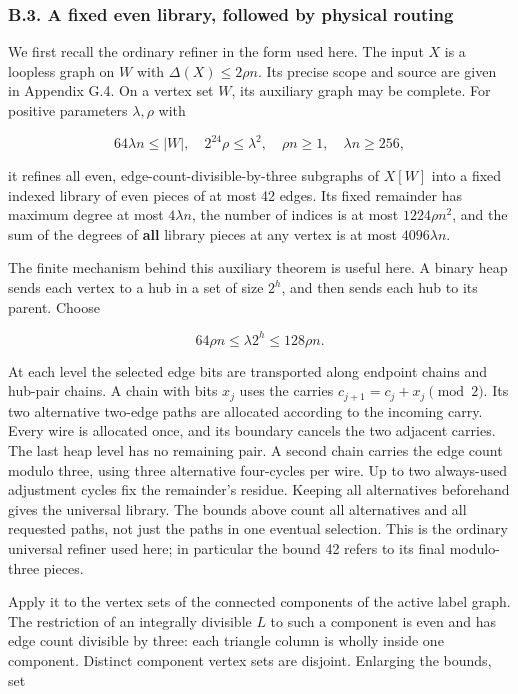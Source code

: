 \documentclass[english,11pt,a4paper]{article}
\begin{document}
\subsubsection{B.3. A fixed even library, followed by physical routing}\label{b.3.-a-fixed-even-library-followed-by-physical-routing}

We first recall the ordinary refiner in the form used here. The input \(X\) is a loopless graph on \(W\) with \(\Delta(X)\le2\rho n\). Its precise scope and source are given in Appendix G.4. On a vertex set \(W\), its auxiliary graph may be complete. For positive parameters \(\lambda,\rho\) with

\[64\lambda n\le |W|,\quad 2^{24}\rho\le\lambda^2,
\quad \rho n\ge1,\quad\lambda n\ge256,
\tag{B.3.1}\]

it refines all even, edge-count-divisible-by-three subgraphs of \(X[W]\) into a fixed indexed library of even pieces of at most 42 edges. Its fixed remainder has maximum degree at most \(4\lambda n\), the number of indices is at most \(1224\rho n^2\), and the sum of the degrees of \textbf{all} library pieces at any vertex is at most \(4096\lambda n\).

The finite mechanism behind this auxiliary theorem is useful here. A binary heap sends each vertex to a hub in a set of size \(2^h\), and then sends each hub to its parent. Choose

\[64\rho n\le\lambda2^h\le128\rho n.
\tag{B.3.2}\]

At each level the selected edge bits are transported along endpoint chains and hub-pair chains. A chain with bits \(x_j\) uses the carries \(c_{j+1}=c_j+x_j\pmod2\). Its two alternative two-edge paths are allocated according to the incoming carry. Every wire is allocated once, and its boundary cancels the two adjacent carries. The last heap level has no remaining pair. A second chain carries the edge count modulo three, using three alternative four-cycles per wire. Up to two always-used adjustment cycles fix the remainder's residue. Keeping all alternatives beforehand gives the universal library. The bounds above count all alternatives and all requested paths, not just the paths in one eventual selection. This is the ordinary universal refiner used here; in particular the bound 42 refers to its final modulo-three pieces.

Apply it to the vertex sets of the connected components of the active label graph. The restriction of an integrally divisible \(L\) to such a component is even and has edge count divisible by three: each triangle column is wholly inside one component. Distinct component vertex sets are disjoint. Enlarging the bounds, set
\end{document}
